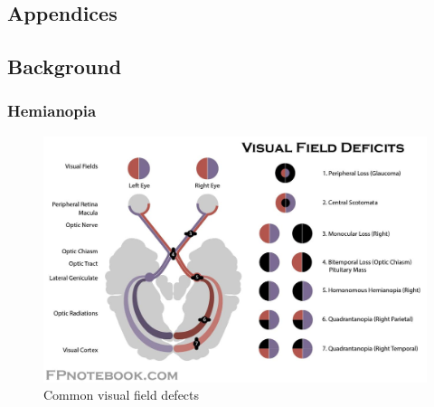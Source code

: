 \documentclass{l4proj}
\begin{document}
\begin{appendices}

\chapter{Appendices}





\section{Background}
\subsection{Hemianopia}
\begin{figure}[!h]
    \centering
    \includegraphics[width=1\linewidth]{images/visualFieldDefects.jpg}
    \caption{Common visual field defects}
    \label{fig:vfDefects}
\end{figure}
\newpage

\end{appendices}
\end{document}

